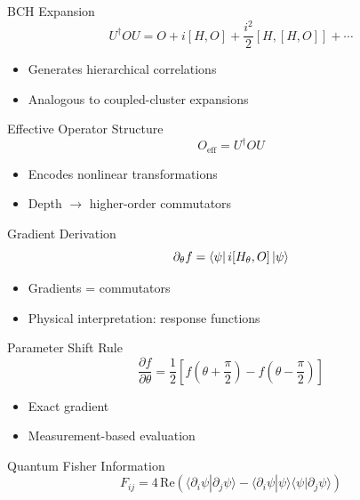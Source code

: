 \documentclass{beamer}
\begin{document}
\begin{frame}{BCH Expansion}
\[
U^\dagger O U = O + i[H,O] + \frac{i^2}{2}[H,[H,O]] + \cdots
\]

\begin{itemize}
\item Generates hierarchical correlations
\item Analogous to coupled-cluster expansions
\end{itemize}
\end{frame}

\begin{frame}{Effective Operator Structure}
\[
O_{\text{eff}} = U^\dagger O U
\]

\begin{itemize}
\item Encodes nonlinear transformations
\item Depth $\rightarrow$ higher-order commutators
\end{itemize}
\end{frame}

\begin{frame}{Gradient Derivation}
\[
\partial_\theta f =
\bra{\psi} i[H_\theta,O] \ket{\psi}
\]

\begin{itemize}
\item Gradients = commutators
\item Physical interpretation: response functions
\end{itemize}
\end{frame}

\begin{frame}{Parameter Shift Rule}
\[
\frac{\partial f}{\partial \theta} =
\frac{1}{2}\left[f(\theta+\frac{\pi}{2}) - f(\theta-\frac{\pi}{2})\right]
\]

\begin{itemize}
\item Exact gradient
\item Measurement-based evaluation
\end{itemize}
\end{frame}

\begin{frame}{Quantum Fisher Information}
\[
F_{ij} = 4\,\mathrm{Re}\left(
\langle \partial_i\psi|\partial_j\psi\rangle -
\langle \partial_i\psi|\psi\rangle
\langle \psi|\partial_j\psi\rangle
\right)
\]
\end{frame}
\end{document}
